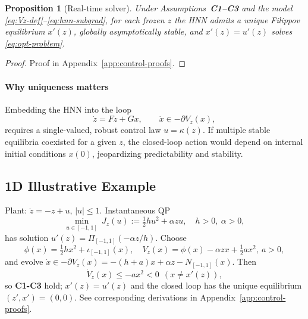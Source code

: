 \documentclass[journal]{IEEEtran}
\theoremstyle{myplain}
\newtheorem{proposition}{Proposition}
\begin{document}
\begin{proposition}[Real-time solver]\label{prop:rt-solver}
Under Assumptions~\textbf{C1--C3} and the model \eqref{eq:Vz-def}–\eqref{eq:hnn-subgrad}, for each frozen \(z\) the HNN admits a unique Filippov equilibrium \(x'(z)\), globally asymptotically stable, and \(x'(z)=u'(z)\) solves \eqref{eq:opt-problem}. 
\end{proposition}
\begin{proof}
  Proof in Appendix~\ref{app:control-proofs}.
\end{proof}

\paragraph*{Why uniqueness matters}
Embedding the HNN into the loop
\begin{equation}\label{eq:closed-loop}
  \dot z = Fz + Gx, \qquad \dot x\in -\partial V_z(x),
\end{equation}
requires a single-valued, robust control law \(u=\kappa(z)\). If multiple stable equilibria coexisted for a given \(z\), the closed-loop action would depend on internal initial conditions \(x(0)\), jeopardizing predictability and stability.

\subsection{1D Illustrative Example}\label{subsec:illustrative-example-control}
Plant: \(\dot z=-z+u\), \(|u|\le 1\). Instantaneous QP
\begin{equation}\label{eq:ex-qp}
  \min_{u\in[-1,1]}\ J_z(u):=\tfrac12 h u^2 + \alpha z u, \quad h>0,\ \alpha>0,
\end{equation}
has solution \(u'(z)=\Pi_{[-1,1]}(-\alpha z/h)\).
Choose
\[
  \phi(x)=\tfrac12 h x^2 + \iota_{[-1,1]}(x),\quad
  V_z(x)=\phi(x)-\alpha zx+\tfrac12 a x^2,\ a>0,
\]
and evolve \(\dot x\in -\partial V_z(x) = -(h+a)x+\alpha z - N_{[-1,1]}(x)\).
Then
\[
  \dot V_z(x)\le -a x^2<0\ \ (x\neq x'(z)),
\]
so \textbf{C1-C3} hold; \(x'(z)=u'(z)\) 
and the closed loop has the unique equilibrium \((z',x')=(0,0)\). 
See corresponding derivations in Appendix~\ref{app:control-proofs}.
\end{document}
